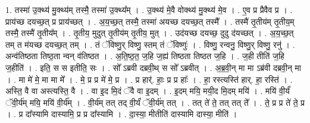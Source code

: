 \documentclass[17pt]{extarticle}
\begin{document}
1. तस्मा॑ उ॒क्थ्य॑ मु॒क्थ्य॑म् तस्मै॒ तस्मा॑ उ॒क्थ्य᳚म् । . उ॒क्थ्य॑ मे॒वै वोक्थ्य॑ मु॒क्थ्य॑ मे॒व । . ए॒व प्र प्रैवैव प्र । . प्राय॑च्छ दयच्छ॒त् प्र प्राय॑च्छत् । . अ॒य॒च्छ॒त् तस्मै॒ तस्मा॑ अयच्छ दयच्छ॒त् तस्मै᳚ । . तस्मै॑ तृ॒तीय॑म् तृ॒तीय॒म् तस्मै॒ तस्मै॑ तृ॒तीय᳚म् । . तृ॒तीय॒ मुदुत् तृ॒तीय॑म् तृ॒तीय॒ मुत् । . उद॑यच्छ दयच्छ॒ दुदु द॑यच्छत् । . अ॒य॒च्छ॒त् तम् त म॑यच्छ दयच्छ॒त् तम् । . तं ॅविष्णु॒र् विष्णु॒ स्तम् तं ॅविष्णुः॑ । . विष्णु॒ रन्वनु॒ विष्णु॒र् विष्णु॒ रनु॑ । . अन्व॑तिष्ठता तिष्ठ॒ता न्वन् व॑तिष्ठत । . अ॒ति॒ष्ठ॒त॒ ज॒हि ज॒ह्य॑ तिष्ठता तिष्ठत ज॒हि । . ज॒ही तीति॑ ज॒हि ज॒हीति॑ । . इति॒ स स इतीति॒ सः । . सो᳚ ऽब्रवी दब्रवी॒थ् स सो᳚ ऽब्रवीत् । . अ॒ब्र॒वी॒न् मा मा ऽब्र॑वी दब्रवी॒न् मा । . मा मे॑ मे॒ मा मा मे᳚ । . मे॒ प्र प्र मे॑ मे॒ प्र । . प्र हार्॑. हाः॒ प्र प्र हाः᳚ । . हा॒ रस्त्यस्ति॑ हार्. हा॒ रस्ति॑ । . अस्ति॒ वै वा अस्त्यस्ति॒ वै । . वा इ॒द मि॒दं ॅवै वा इ॒दम् । . इ॒दम् मयि॒ मयी॒द मि॒दम् मयि॑ । . मयि॑ वी॒र्यं॑ ॅवी॒र्य॑म् मयि॒ मयि॑ वी॒र्य᳚म् । . वी॒र्य॑म् तत् तद् वी॒र्यं॑ ॅवी॒र्य॑म् तत् । . तत् ते॑ ते॒ तत् तत् ते᳚ । . ते॒ प्र प्र ते॑ ते॒ प्र । . प्र दा᳚स्यामि दास्यामि॒ प्र प्र दा᳚स्यामि । . दा॒स्या॒ मीतीति॑ दास्यामि दास्या॒ मीति॑ । \newline
\end{document}
